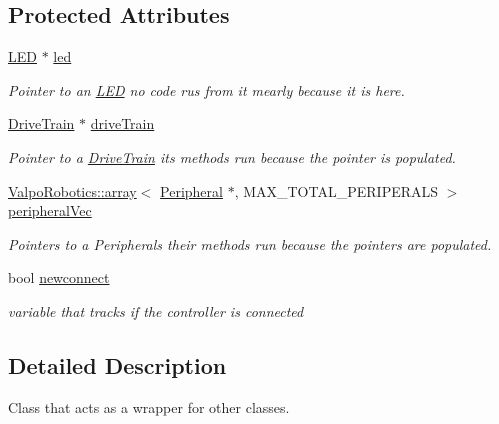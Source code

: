 \subsection*{Protected Attributes}
\begin{DoxyCompactItemize}
\item 
\mbox{\hyperlink{class_l_e_d}{L\+ED}} $\ast$ \mbox{\hyperlink{class_robot_a28c6c49c9a12c8767e118e0e8a4165cf}{led}}
\begin{DoxyCompactList}\small\item\em Pointer to an \mbox{\hyperlink{class_l_e_d}{L\+ED}} no code rus from it mearly because it is here. \end{DoxyCompactList}\item 
\mbox{\hyperlink{class_drive_train}{Drive\+Train}} $\ast$ \mbox{\hyperlink{class_robot_a4b499841182a38720a26a493fa98363a}{drive\+Train}}
\begin{DoxyCompactList}\small\item\em Pointer to a \mbox{\hyperlink{class_drive_train}{Drive\+Train}} its methods run because the pointer is populated. \end{DoxyCompactList}\item 
\mbox{\hyperlink{class_valpo_robotics_1_1array}{Valpo\+Robotics\+::array}}$<$ \mbox{\hyperlink{class_peripheral}{Peripheral}} $\ast$, M\+A\+X\+\_\+\+T\+O\+T\+A\+L\+\_\+\+P\+E\+R\+I\+P\+E\+R\+A\+LS $>$ \mbox{\hyperlink{class_robot_a8db438771a3e7dc9d2cf5dd2e1d25f74}{peripheral\+Vec}}
\begin{DoxyCompactList}\small\item\em Pointers to a Peripherals their methods run because the pointers are populated. \end{DoxyCompactList}\item 
\mbox{\label{class_robot_a19c7a18705cf4bc4359f5ba12c3541d8}} 
bool \mbox{\hyperlink{class_robot_a19c7a18705cf4bc4359f5ba12c3541d8}{newconnect}}
\begin{DoxyCompactList}\small\item\em variable that tracks if the controller is connected \end{DoxyCompactList}\end{DoxyCompactItemize}


\subsection{Detailed Description}
Class that acts as a wrapper for other classes. 

